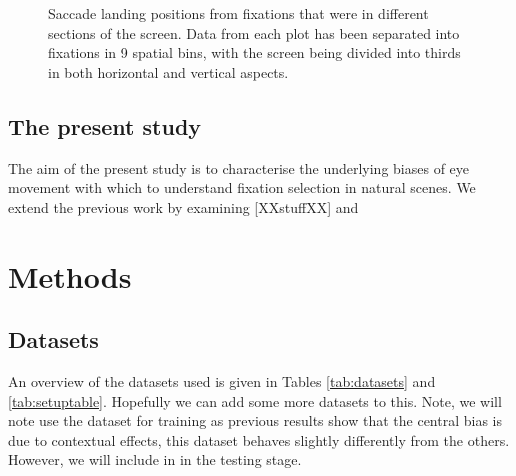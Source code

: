 \documentclass[a4paper, onecolumn, oneside, 11pt]{article}
\begin{document}
\begin{figure}
\caption{Saccade landing positions from fixations that were in different sections of the screen. Data from each plot has been separated into fixations in 9 spatial bins, with the screen being divided into thirds in both horizontal and vertical aspects.}
\label{fig:empiricalSaccadicFlow}
\end{figure}



\subsection{The present study}
The aim of the present study is to characterise the underlying biases of eye movement with which to understand fixation selection in natural scenes. We extend the previous work by examining [XXstuffXX] and 

\section{Methods}

\subsection{Datasets}

An overview of the datasets used is given in Tables \ref{tab:datasets} and \ref{tab:setuptable}. Hopefully we can add some more datasets to this. Note, we will note use the \cite{ehinger2009} dataset for training as previous results show that the central bias is due to contextual effects, this dataset behaves slightly differently from the others. However, we will include in in the testing stage. 
\end{document}
